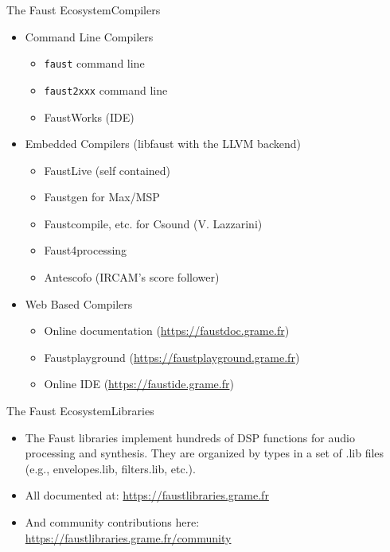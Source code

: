 
\begin{frame}{The Faust Ecosystem}{Compilers}
	
\begin{itemize}
\item Command Line Compilers
	\begin{itemize}
	\item \lstinline'faust' command line
	\item \lstinline'faust2xxx' command line
	\item FaustWorks (IDE)
	\end{itemize}
\item Embedded Compilers (libfaust with the LLVM backend)
	\begin{itemize}
	\item FaustLive (self contained)
	\item Faustgen for Max/MSP
	\item Faustcompile, etc. for Csound (V. Lazzarini)
	\item Faust4processing
	\item Antescofo (IRCAM's score follower)
	\end{itemize}
\item Web Based Compilers
	\begin{itemize}
	\item Online documentation (\url{https://faustdoc.grame.fr})
	\item Faustplayground (\url{https://faustplayground.grame.fr})
	\item Online IDE (\url{https://faustide.grame.fr})
	\end{itemize}

\end{itemize}
\end{frame}

\begin{frame}{The Faust Ecosystem}{Libraries}

\begin{itemize}
\item The Faust libraries implement hundreds of DSP functions for audio processing and synthesis. They are organized by types in a set of .lib files (e.g., envelopes.lib, filters.lib, etc.).
\item All documented at: \url{https://faustlibraries.grame.fr}
\item And community contributions here: \url{https://faustlibraries.grame.fr/community}
\end{itemize}

\end{frame}

